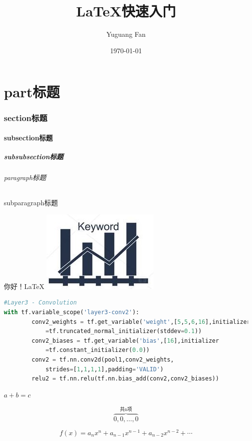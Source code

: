\documentclass[11pt,a4paper]{article}
\title{LaTeX快速入门}
\author{Yuguang Fan}
\date{\today}
\begin{document}
\maketitle

\part{part标题}
\section{section标题}
\subsection{subsection标题}
\subsubsection{subsubsection标题}
\paragraph{paragraph标题}
\subparagraph{subparagraph标题}

你好！LaTeX
\includegraphics{./pic/temp/temporal.jpg}

\begin{lstlisting}[language={Python}]
#Layer3 - Convolution
with tf.variable_scope('layer3-conv2'):
        conv2_weights = tf.get_variable('weight',[5,5,6,16],initializer
            =tf.truncated_normal_initializer(stddev=0.1))
        conv2_biases = tf.get_variable('bias',[16],initializer
            =tf.constant_initializer(0.0))
        conv2 = tf.nn.conv2d(pool1,conv2_weights,
            strides=[1,1,1,1],padding='VALID')
        relu2 = tf.nn.relu(tf.nn.bias_add(conv2,conv2_biases))
\end{lstlisting}

$a+b=c$

$$
\overbrace{0,0,\dots,0}^{\text{共n项}}
$$

$$
{f(x)=a_nx^n+a_{n-1}x^{n-1}+a_{n-2}x^{n-2}}+\cdots
$$
\end{document}
